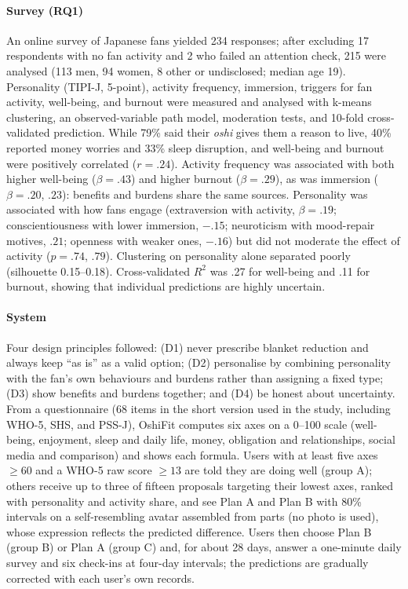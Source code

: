 \paragraph{Survey (RQ1)}
An online survey of Japanese fans yielded 234 responses; after excluding 17 respondents with no fan activity and 2 who failed an attention check, 215 were analysed (113 men, 94 women, 8 other or undisclosed; median age 19). Personality (TIPI-J, 5-point), activity frequency, immersion, triggers for fan activity, well-being, and burnout were measured and analysed with k-means clustering, an observed-variable path model, moderation tests, and 10-fold cross-validated prediction. While 79\% said their \textit{oshi} gives them a reason to live, 40\% reported money worries and 33\% sleep disruption, and well-being and burnout were positively correlated ($r=.24$). Activity frequency was associated with both higher well-being ($\beta=.43$) and higher burnout ($\beta=.29$), as was immersion ($\beta=.20$, $.23$): benefits and burdens share the same sources. Personality was associated with how fans engage (extraversion with activity, $\beta=.19$; conscientiousness with lower immersion, $-.15$; neuroticism with mood-repair motives, $.21$; openness with weaker ones, $-.16$) but did not moderate the effect of activity ($p=.74$, $.79$). Clustering on personality alone separated poorly (silhouette 0.15--0.18). Cross-validated $R^2$ was .27 for well-being and .11 for burnout, showing that individual predictions are highly uncertain.

\paragraph{System}
Four design principles followed: (D1) never prescribe blanket reduction and always keep ``as is'' as a valid option; (D2) personalise by combining personality with the fan's own behaviours and burdens rather than assigning a fixed type; (D3) show benefits and burdens together; and (D4) be honest about uncertainty. From a questionnaire (68 items in the short version used in the study, including WHO-5, SHS, and PSS-J), OshiFit computes six axes on a 0--100 scale (well-being, enjoyment, sleep and daily life, money, obligation and relationships, social media and comparison) and shows each formula. Users with at least five axes $\geq 60$ and a WHO-5 raw score $\geq 13$ are told they are doing well (group A); others receive up to three of fifteen proposals targeting their lowest axes, ranked with personality and activity share, and see Plan A and Plan B with 80\% intervals on a self-resembling avatar assembled from parts (no photo is used), whose expression reflects the predicted difference. Users then choose Plan B (group B) or Plan A (group C) and, for about 28 days, answer a one-minute daily survey and six check-ins at four-day intervals; the predictions are gradually corrected with each user's own records.

